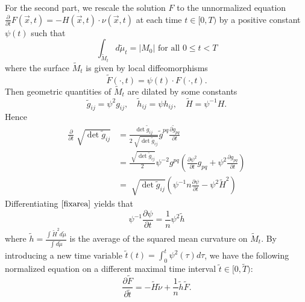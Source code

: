For the second part, we rescale the solution $F$ to the unnormalized equation $\frac{\partial }{\partial t} F(\vec{x},t)=-H(\vec{x},t) \cdot \nu (\vec{x},t)$ at each time $t \in [0,T)$ by a positive constant $\psi(t)$ such that 
\begin{equation} \label{fixarea}
	\int_{\tilde{M}_t}^{} d \tilde{\mu }_t = \left| M_0 \right| \text{ for all } 0 \leq t < T
\end{equation}
where the surface $\tilde{M}_t$ is given by local diffeomorphisms
\[\tilde{F}(\cdot ,t)=\psi (t) \cdot F(\cdot ,t).\]
Then geometric quantities of $\tilde{M}_t$ are dilated by some constants
\[\tilde{g }_{ij }^{}=\psi ^2 g_{ij }^{}, \quad  \tilde{h}_{ij}=\psi h_{ij }^{} , \quad  \tilde{H}=\psi ^{-1} H. \]
Hence
\begin{equation*}
\begin{split}
	\frac{\partial }{\partial t} \sqrt[]{\det \tilde{g}_{ij }^{} } 
&=  \frac{\det \tilde{g}_{ij }^{}}{2 \sqrt[]{\det \tilde{g}_{ij }^{}}} \tilde{g}_{ }^{pq} \frac{\partial \tilde{g}_{pq }^{} }{\partial t}  \\
&= \frac{\sqrt[]{\det \tilde{g}_{ij }^{} }}{2}\psi ^{-2}g_{ }^{pq} \left( \frac{\partial \psi^2 }{\partial t} g_{ pq}^{}  + \psi^2 \frac{\partial g_{ pq}^{} }{\partial t}  \right) \\
&= \sqrt[]{\det \tilde{g}_{ij }^{} }\left(\psi ^{-1}n  \frac{\partial \psi }{\partial t}   - \psi ^2 \tilde{H}^2  \right)
\end{split}
\end{equation*}
Differentiating $\autoref{fixarea}$ yields that
\[\psi ^{-1}  \frac{\partial \psi }{\partial t}   = \frac{1}{n}\psi ^2 \tilde{h}\]
where $\tilde{h}=\frac{\int_{}^{}\tilde{H}^2 d \tilde{\mu} }{\int_{}^{}d \tilde{\mu} }$ is the average of the squared mean curvature on $\tilde{M}_t$. 
By introducing a new time variable $\tilde{t}(t)=\int_{0}^{t}\psi ^2(\tau )d \tau $, we have the following normalized equation on a different maximal time interval $\tilde{t} \in [0,\tilde{T})$:
\[\frac{\partial \tilde{F}}{\partial \tilde{t}}=-\tilde{H}\tilde{\nu }+ \frac{1}{n}\tilde{h}\tilde{F}.\]

